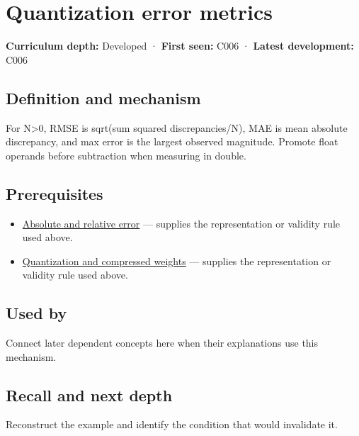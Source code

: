 \hypertarget{appendix-537171d69d27}{}\label{referencestart:appendix-537171d69d27}
\section{Quantization error metrics}\label{appendix-537171d69d27-quantization-error-metrics}

\textbf{Curriculum depth:} Developed · \textbf{First seen:} C006 · \textbf{Latest development:} C006

\subsection{Definition and mechanism}\label{appendix-537171d69d27-definition-and-mechanism}

For N\textgreater0, RMSE is sqrt(sum squared discrepancies/N), MAE is mean absolute discrepancy, and max error is the largest observed magnitude. Promote float operands before subtraction when measuring in double.

\subsection{Prerequisites}\label{appendix-537171d69d27-prerequisites}

\begin{itemize}
\tightlist
\item
  \hyperref[appendix-3ae74e89b4e6]{Absolute and relative error} --- supplies the representation or validity rule used above.
\item
  \hyperref[appendix-fdc7879e8bf2]{Quantization and compressed weights} --- supplies the representation or validity rule used above.
\end{itemize}

\subsection{Used by}\label{appendix-537171d69d27-used-by}

Connect later dependent concepts here when their explanations use this mechanism.

\subsection{Recall and next depth}\label{appendix-537171d69d27-recall-and-next-depth}

Reconstruct the example and identify the condition that would invalidate it.

